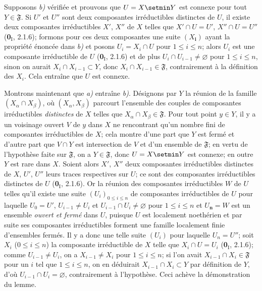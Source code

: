 Supposons \emph{b)} vérifiée et prouvons que $U=X\setmin Y$ est connexe pour tout
$Y\in\mathfrak F$. Si $U'$ et $U''$ sont deux composantes irréductibles
distinctes de $U$, il existe deux composantes irréductibles $X'$, $X''$ de
$X$ telles que $X'\cap U=U'$, $X''\cap U=U''$ (\textbf{0}$_\mathrm I$, 2.1.6);
formons pour ces deux composantes une suite $(X_{\boldsymbol{i}})$ ayant la propriété énoncée
dans \emph{b)} et posons $U_i=X_i\cap U$ pour $1\leq i\leq n$; alors $U_i$ est une
composante irréductible de $U$ (\textbf{0}$_\mathrm I$, 2.1.6) et de plus
$U_i\cap U_{i-1}\neq\varnothing$ pour $1\leq i\leq n$, sinon on aurait
$X_i\cap X_{i-1}\subset Y$, donc $X_i\cap X_{i-1}\in\mathfrak F$,
contrairement à la définition des $X_i$. Cela entraîne que $U$ est connexe.

Montrons maintenant que \emph{a)} entraîne \emph{b)}. Désignons par $Y$ la réunion de la
famille $(X_\alpha\cap X_\beta)$, où $(X_\alpha,X_\beta)$ parcourt l'ensemble
des couples de composantes irréductibles \emph{distinctes} de $X$ telles que
$X_\alpha\cap X_\beta\in\mathfrak F$. Pour tout point $y\in Y$, il y a un
voisinage ouvert $V$ de $y$ dans $X$ ne rencontrant qu'un nombre fini de
composantes irréductibles de $X$; cela montre d'une part que $Y$ est fermé et
d'autre part que $V\cap Y$ est intersection de $V$ et d'un ensemble de
$\mathfrak F$; en vertu de l'hypothèse faite sur $\mathfrak F$, on a
$Y\in\mathfrak F$, donc $U=X\setmin Y$ est connexe; en outre $Y$ est rare dans $X$.
Soient alors $X'$, $X''$ deux composantes irréductibles distinctes de $X$,
$U'$, $U''$ leurs traces respectives sur $U$; ce sont des composantes
irréductibles distinctes de $U$ (\textbf{0}$_\mathrm I$, 2.1.6). Or la réunion des
composantes irréductibles $W$ de $U$ telles qu'il existe une suite
$(U_i)_{0\leq i\leq n}$ de composantes irréductibles de $U$ pour laquelle
$U_0=U'$, $U_{i-1}\neq U_i$ et $U_{i-1}\cap U_i\neq\varnothing$ pour
$1\leq i\leq n$ et $U_{\boldsymbol{n}}=W$ est un ensemble \emph{ouvert et fermé} dans $U$, puisque
$U$ est localement noethérien et par suite ses composantes irréductibles
forment une famille localement finie d'ensembles fermés. Il y a donc une telle
suite $(U_i)$ pour laquelle $U_n=U''$; soit $X_i$ ($0\leq i\leq n$) la
composante irréductible de $X$ telle que $X_i\cap U=U_i$
(\textbf{0}$_\mathrm I$, 2.1.6); comme $U_{i-1}\neq U_i$, on a
$X_{i-1}\neq X_i$ pour $1\leq i\leq n$; si l'on avait
$X_{i-1}\cap X_i\in\mathfrak F$ pour un $i$ tel que $1\leq i\leq n$, on en
déduirait $X_{i-1}\cap X_i\subset Y$ par définition de $Y$, d'où
$U_{i-1}\cap U_i=\varnothing$, contrairement à l'hypothèse. Ceci achève la
démonstration du lemme.

